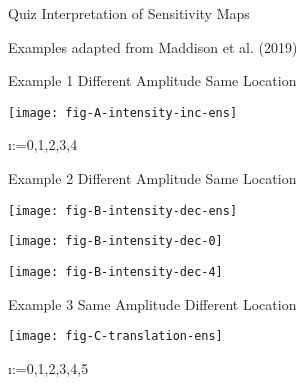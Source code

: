 \documentclass{slides}
\begin{document}
\begin{center}

    \large

    \begin{slide}
        {\Huge Quiz} \vspace{1em}\break
        Interpretation of Sensitivity Maps

        {\tiny Examples adapted from Maddison et al. (2019)}
    \end{slide}


    \begin{slide}
        {\Huge Example 1} \vspace{1em}\break
        Different Amplitude \break
        Same Location
    \end{slide}
    \begin{slide}
        \texttt{[image: fig-A-intensity-inc-ens]}
    \end{slide}
    \makeatletter
    \@for\i:={0,1,2,3,4}
    \makeatother


    \begin{slide}
        {\Huge Example 2} \vspace{1em}\break
        Different Amplitude \break
        Same Location
    \end{slide}
    \begin{slide}
        \texttt{[image: fig-B-intensity-dec-ens]}
    \end{slide}
    \begin{slide}
        \texttt{[image: fig-B-intensity-dec-0]}
    \end{slide}
    \begin{slide}
        \texttt{[image: fig-B-intensity-dec-4]}
    \end{slide}


    \begin{slide}
        {\Huge Example 3} \vspace{1em}\break
        Same Amplitude \break
        Different Location
    \end{slide}
    \begin{slide}
        \texttt{[image: fig-C-translation-ens]}
    \end{slide}
    \makeatletter
        \@for\i:={0,1,2,3,4,5}
    \makeatother



\end{center}
\end{document}

